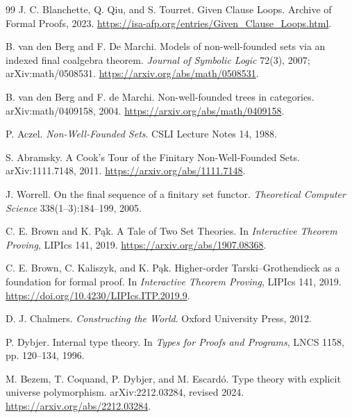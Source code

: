 \documentclass[11pt]{article}
\theoremstyle{definition}
\theoremstyle{remark}
\begin{document}
\begin{thebibliography}{99}
J. C. Blanchette, Q. Qiu, and S. Tourret.
\newblock Given Clause Loops.
\newblock Archive of Formal Proofs, 2023.
\newblock \url{https://isa-afp.org/entries/Given_Clause_Loops.html}.

B. van den Berg and F. De Marchi.
\newblock Models of non-well-founded sets via an indexed final coalgebra
  theorem.
\newblock \emph{Journal of Symbolic Logic} 72(3), 2007; arXiv:math/0508531.
\newblock \url{https://arxiv.org/abs/math/0508531}.

B. van den Berg and F. de Marchi.
\newblock Non-well-founded trees in categories.
\newblock arXiv:math/0409158, 2004.
\newblock \url{https://arxiv.org/abs/math/0409158}.

P. Aczel.
\newblock \emph{Non-Well-Founded Sets}.
\newblock CSLI Lecture Notes 14, 1988.

S. Abramsky.
\newblock A Cook's Tour of the Finitary Non-Well-Founded Sets.
\newblock arXiv:1111.7148, 2011.
\newblock \url{https://arxiv.org/abs/1111.7148}.

J. Worrell.
\newblock On the final sequence of a finitary set functor.
\newblock \emph{Theoretical Computer Science} 338(1--3):184--199, 2005.

C. E. Brown and K. P\k{a}k.
\newblock A Tale of Two Set Theories.
\newblock In \emph{Interactive Theorem Proving}, LIPIcs 141, 2019.
\newblock \url{https://arxiv.org/abs/1907.08368}.

C. E. Brown, C. Kaliszyk, and K. P\k{a}k.
\newblock Higher-order Tarski--Grothendieck as a foundation for formal proof.
\newblock In \emph{Interactive Theorem Proving}, LIPIcs 141, 2019.
\newblock \url{https://doi.org/10.4230/LIPIcs.ITP.2019.9}.

D. J. Chalmers.
\newblock \emph{Constructing the World}.
\newblock Oxford University Press, 2012.

P. Dybjer.
\newblock Internal type theory.
\newblock In \emph{Types for Proofs and Programs}, LNCS 1158,
  pp. 120--134, 1996.

M. Bezem, T. Coquand, P. Dybjer, and M. Escard\'o.
\newblock Type theory with explicit universe polymorphism.
\newblock arXiv:2212.03284, revised 2024.
\newblock \url{https://arxiv.org/abs/2212.03284}.


\end{thebibliography}
\end{document}

